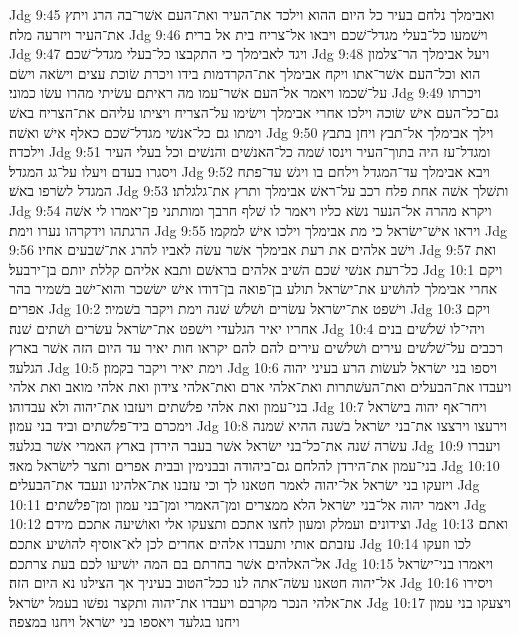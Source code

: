 Jdg 9:45  ואבימלך נלחם בעיר כל היום ההוא וילכד את־העיר ואת־העם אשׁר־בה הרג ויתץ את־העיר ויזרעה מלח׃
Jdg 9:46  וישׁמעו כל־בעלי מגדל־שׁכם ויבאו אל־צריח בית אל ברית׃
Jdg 9:47  ויגד לאבימלך כי התקבצו כל־בעלי מגדל־שׁכם׃
Jdg 9:48  ויעל אבימלך הר־צלמון הוא וכל־העם אשׁר־אתו ויקח אבימלך את־הקרדמות בידו ויכרת שׂוכת עצים וישׂאה וישׂם על־שׁכמו ויאמר אל־העם אשׁר־עמו מה ראיתם עשׂיתי מהרו עשׂו כמוני׃
Jdg 9:49  ויכרתו גם־כל־העם אישׁ שׂוכה וילכו אחרי אבימלך וישׂימו על־הצריח ויציתו עליהם את־הצריח באשׁ וימתו גם כל־אנשׁי מגדל־שׁכם כאלף אישׁ ואשׁה׃
Jdg 9:50  וילך אבימלך אל־תבץ ויחן בתבץ וילכדה׃
Jdg 9:51  ומגדל־עז היה בתוך־העיר וינסו שׁמה כל־האנשׁים והנשׁים וכל בעלי העיר ויסגרו בעדם ויעלו על־גג המגדל׃
Jdg 9:52  ויבא אבימלך עד־המגדל וילחם בו ויגשׁ עד־פתח המגדל לשׂרפו באשׁ׃
Jdg 9:53  ותשׁלך אשׁה אחת פלח רכב על־ראשׁ אבימלך ותרץ את־גלגלתו׃
Jdg 9:54  ויקרא מהרה אל־הנער נשׂא כליו ויאמר לו שׁלף חרבך ומותתני פן־יאמרו לי אשׁה הרגתהו וידקרהו נערו וימת׃
Jdg 9:55  ויראו אישׁ־ישׂראל כי מת אבימלך וילכו אישׁ למקמו׃
Jdg 9:56  וישׁב אלהים את רעת אבימלך אשׁר עשׂה לאביו להרג את־שׁבעים אחיו׃
Jdg 9:57  ואת כל־רעת אנשׁי שׁכם השׁיב אלהים בראשׁם ותבא אליהם קללת יותם בן־ירבעל׃
Jdg 10:1  ויקם אחרי אבימלך להושׁיע את־ישׂראל תולע בן־פואה בן־דודו אישׁ ישׂשכר והוא־ישׁב בשׁמיר בהר אפרים׃
Jdg 10:2  וישׁפט את־ישׂראל עשׂרים ושׁלשׁ שׁנה וימת ויקבר בשׁמיר׃
Jdg 10:3  ויקם אחריו יאיר הגלעדי וישׁפט את־ישׂראל עשׂרים ושׁתים שׁנה׃
Jdg 10:4  ויהי־לו שׁלשׁים בנים רכבים על־שׁלשׁים עירים ושׁלשׁים עירים להם להם יקראו חות יאיר עד היום הזה אשׁר בארץ הגלעד׃
Jdg 10:5  וימת יאיר ויקבר בקמון׃
Jdg 10:6  ויספו בני ישׂראל לעשׂות הרע בעיני יהוה ויעבדו את־הבעלים ואת־העשׁתרות ואת־אלהי ארם ואת־אלהי צידון ואת אלהי מואב ואת אלהי בני־עמון ואת אלהי פלשׁתים ויעזבו את־יהוה ולא עבדוהו׃
Jdg 10:7  ויחר־אף יהוה בישׂראל וימכרם ביד־פלשׁתים וביד בני עמון׃
Jdg 10:8  וירעצו וירצצו את־בני ישׂראל בשׁנה ההיא שׁמנה עשׂרה שׁנה את־כל־בני ישׂראל אשׁר בעבר הירדן בארץ האמרי אשׁר בגלעד׃
Jdg 10:9  ויעברו בני־עמון את־הירדן להלחם גם־ביהודה ובבנימין ובבית אפרים ותצר לישׂראל מאד׃
Jdg 10:10  ויזעקו בני ישׂראל אל־יהוה לאמר חטאנו לך וכי עזבנו את־אלהינו ונעבד את־הבעלים׃
Jdg 10:11  ויאמר יהוה אל־בני ישׂראל הלא ממצרים ומן־האמרי ומן־בני עמון ומן־פלשׁתים׃
Jdg 10:12  וצידונים ועמלק ומעון לחצו אתכם ותצעקו אלי ואושׁיעה אתכם מידם׃
Jdg 10:13  ואתם עזבתם אותי ותעבדו אלהים אחרים לכן לא־אוסיף להושׁיע אתכם׃
Jdg 10:14  לכו וזעקו אל־האלהים אשׁר בחרתם בם המה יושׁיעו לכם בעת צרתכם׃
Jdg 10:15  ויאמרו בני־ישׂראל אל־יהוה חטאנו עשׂה־אתה לנו ככל־הטוב בעיניך אך הצילנו נא היום הזה׃
Jdg 10:16  ויסירו את־אלהי הנכר מקרבם ויעבדו את־יהוה ותקצר נפשׁו בעמל ישׂראל׃
Jdg 10:17  ויצעקו בני עמון ויחנו בגלעד ויאספו בני ישׂראל ויחנו במצפה׃
